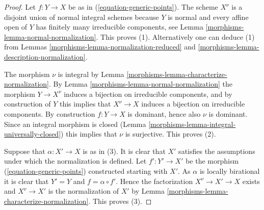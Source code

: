 \begin{proof}

Let $f : Y \to X$ be as in (\ref{equation-generic-points}).
The scheme $X^\nu$ is a disjoint union of normal integral schemes
because $Y$ is normal and every affine open of $Y$ has finitely
many irreducible components, see
Lemma \ref{morphisms-lemma-normal-normalization}. This proves (1).
Alternatively one can deduce (1) from
Lemmas \ref{morphisms-lemma-normalization-reduced} and
\ref{morphisms-lemma-description-normalization}.

\medskip\noindent
The morphism $\nu$ is integral by Lemma \ref{morphisms-lemma-characterize-normalization}.
By Lemma \ref{morphisms-lemma-normal-normalization} the
morphism $Y \to X^\nu$ induces a bijection on irreducible components,
and by construction of $Y$ this implies that $X^\nu \to X$ induces
a bijection on irreducible components. By construction $f : Y \to X$
is dominant, hence also $\nu$ is dominant. Since an integral morphism is
closed (Lemma \ref{morphisms-lemma-integral-universally-closed}) this implies that
$\nu$ is surjective. This proves (2).

\medskip\noindent
Suppose that $\alpha : X' \to X$ is as in (3). It is clear that
$X'$ satisfies the assumptions under which the normalization
is defined. Let $f' : Y' \to X'$ be the morphism
(\ref{equation-generic-points}) constructed starting with $X'$.
As $\alpha$ is locally birational it is clear that
$Y' = Y$ and $f = \alpha \circ f'$.
Hence the factorization $X^\nu \to X' \to X$ exists
and $X^\nu \to X'$ is the normalization of $X'$ by
Lemma \ref{morphisms-lemma-characterize-normalization}. This proves (3).


\end{proof}
